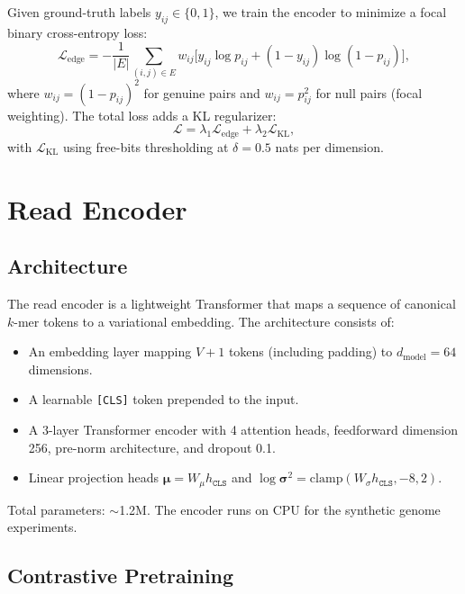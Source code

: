 \documentclass[11pt,a4paper]{article}
\newcommand{\bmu}{\boldsymbol{\mu}}
\newcommand{\KL}{\mathrm{KL}}
\begin{document}
Given ground-truth labels $y_{ij} \in \{0, 1\}$, we train the encoder
to minimize a focal binary cross-entropy loss:
\begin{equation}
  \mathcal{L}_{\mathrm{edge}}
    = -\frac{1}{|E|} \sum_{(i,j) \in E}
      w_{ij} \bigl[
        y_{ij} \log p_{ij} + (1 - y_{ij}) \log(1 - p_{ij})
      \bigr],
\end{equation}
where $w_{ij} = (1 - p_{ij})^2$ for genuine pairs and $w_{ij} =
p_{ij}^2$ for null pairs (focal weighting).  The total loss adds a
KL regularizer:
\begin{equation}
  \mathcal{L} = \lambda_1 \mathcal{L}_{\mathrm{edge}}
              + \lambda_2 \mathcal{L}_{\KL},
\end{equation}
with $\mathcal{L}_{\KL}$ using free-bits thresholding
\citep{kingma2016improved} at $\delta = 0.5$ nats per dimension.


\section{Read Encoder}
\label{sec:encoder}

\subsection{Architecture}

The read encoder is a lightweight Transformer that maps a sequence of
canonical $k$-mer tokens to a variational embedding.  The architecture
consists of:
\begin{itemize}
  \item An embedding layer mapping $V + 1$ tokens (including padding)
    to $d_{\mathrm{model}} = 64$ dimensions.
  \item A learnable \texttt{[CLS]} token prepended to the input.
  \item A 3-layer Transformer encoder with 4 attention heads,
    feedforward dimension 256, pre-norm architecture, and dropout 0.1.
  \item Linear projection heads $\bmu = W_\mu h_{\texttt{CLS}}$ and
    $\log\boldsymbol{\sigma}^2 = \mathrm{clamp}(W_\sigma
    h_{\texttt{CLS}}, -8, 2)$.
\end{itemize}
Total parameters: $\sim$1.2M.  The encoder runs on CPU for the
synthetic genome experiments.

\subsection{Contrastive Pretraining}
\label{sec:contrastive}
\end{document}
